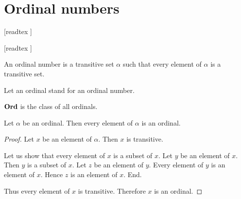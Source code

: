 \documentclass[../../set-theory/set-theory.tex]{subfiles}
\begin{document}
  \chapter{Ordinal numbers}\label{chapter:ordinals}


  \begin{forthel}

    [readtex ]

    [readtex ]

  \end{forthel}


  \begin{forthel}
    \begin{definition}
      An ordinal number is a transitive set $\alpha$ such that every element of
      $\alpha$ is a transitive set.
    \end{definition}

    Let an ordinal stand for an ordinal number.
  \end{forthel}

  \begin{forthel}
    \begin{definition}
      $\mathbf{Ord}$ is the class of all ordinals.
    \end{definition}
  \end{forthel}

  \begin{forthel}
    \begin{proposition}
      Let $\alpha$ be an ordinal.
      Then every element of $\alpha$ is an ordinal.
    \end{proposition}
    \begin{proof}
      Let $x$ be an element of $\alpha$.
      Then $x$ is transitive.

      Let us show that every element of $x$ is a subset of $x$.
        Let $y$ be an element of $x$.
        Then $y$ is a subset of $x$.
        Let $z$ be an element of $y$.
        Every element of $y$ is an element of $x$.
        Hence $z$ is an element of $x$.
      End.

      Thus every element of $x$ is transitive.
      Therefore $x$ is an ordinal.
    \end{proof}
  \end{forthel}
\end{document}
